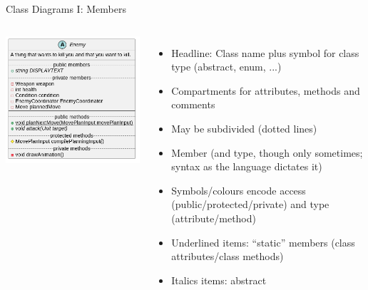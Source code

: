 \begin{frame}{Class Diagrams I: Members}
%
\vspace{-6pt}
\begin{columns}
\includegraphics[width=\linewidth]{./gfx/15-uml-detail}
%
\begin{itemize}
\item Headline: Class name plus symbol for class type (abstract, enum, ...)
\item Compartments for attributes, methods and comments
\item May be subdivided (dotted lines)
\item Member (and type, though only sometimes; syntax as the language dictates it)
\item Symbols/colours encode access (public/protected/private) and type (attribute/method)
\item Underlined items: \enquote{static} members (class attributes/class methods)
\item Italics items: abstract
\end{itemize}
\end{columns}
%
\end{frame}


